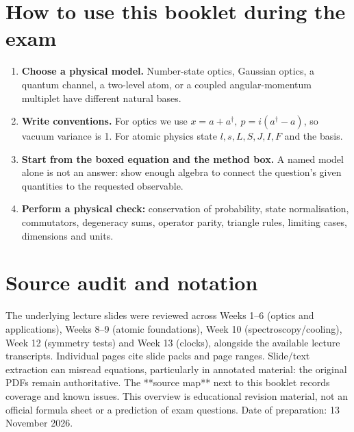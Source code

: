 \section*{How to use this booklet during the exam}
\begin{enumerate}
\item \textbf{Choose a physical model.} Number-state optics, Gaussian optics,
a quantum channel, a two-level atom, or a coupled angular-momentum multiplet
have different natural bases.
\item \textbf{Write conventions.} For optics we use
\(x=a+a^\dagger,\ p=i(a^\dagger-a)\), so vacuum variance is 1.
For atomic physics state \(l,s,L,S,J,I,F\) and the basis.
\item \textbf{Start from the boxed equation and the method box.}
A named model alone is not an answer: show enough algebra to connect
the question's given quantities to the requested observable.
\item \textbf{Perform a physical check:} conservation of probability,
state normalisation, commutators, degeneracy sums, operator parity,
triangle rules, limiting cases, dimensions and units.
\end{enumerate}
\section*{Source audit and notation}
The underlying lecture slides were reviewed across
Weeks 1--6 (optics and applications), Weeks 8--9 (atomic foundations),
Week 10 (spectroscopy/cooling), Week 12 (symmetry tests) and Week 13
(clocks), alongside the available lecture transcripts.
Individual pages cite slide packs and page ranges. Slide/text extraction
can misread equations, particularly in annotated material: the
original PDFs remain authoritative. The **source map** next to this
booklet records coverage and known issues.
\vfill
{\small\color{gray}
This overview is educational revision material, not an official
formula sheet or a prediction of exam questions.
Date of preparation: 13 November 2026.}
